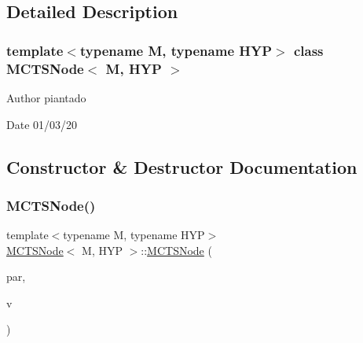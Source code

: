 \subsection{Detailed Description}
\subsubsection*{template$<$typename M, typename H\+YP$>$\newline
class M\+C\+T\+S\+Node$<$ M, H\+Y\+P $>$}

\begin{DoxyAuthor}{Author}
piantado 
\end{DoxyAuthor}
\begin{DoxyDate}{Date}
01/03/20 
\end{DoxyDate}


\subsection{Constructor \& Destructor Documentation}
\mbox{\label{class_m_c_t_s_node_a94e679ddbb9f4eeaaa45b6214889f47c}} 
\subsubsection{\texorpdfstring{M\+C\+T\+S\+Node()}{MCTSNode()}\hspace{0.1cm}{\footnotesize\ttfamily [1/4]}}
{\footnotesize\ttfamily template$<$typename M, typename H\+YP$>$ \\
\hyperlink{class_m_c_t_s_node}{M\+C\+T\+S\+Node}$<$ M, H\+YP $>$\+::\hyperlink{class_m_c_t_s_node}{M\+C\+T\+S\+Node} (\begin{DoxyParamCaption}\item[{M $\ast$}]{par,  }\item[{H\+YP \&}]{v }\end{DoxyParamCaption})\hspace{0.3cm}{\ttfamily [inline]}}

\mbox{\label{class_m_c_t_s_node_a060826eaa8052beac2adf61c53916040}} 
